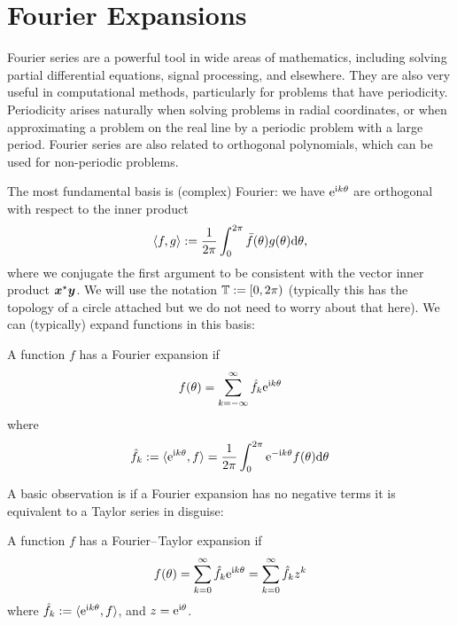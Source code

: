 
\section{Fourier Expansions}
Fourier series are a powerful tool in wide areas of mathematics, including solving partial differential equations, signal processing, and elsewhere. They are also very useful in computational methods, particularly for problems that have periodicity. Periodicity arises naturally when solving problems in radial coordinates, or when approximating a problem on the real line by a periodic problem with a large period. Fourier series are also related to orthogonal polynomials, which can be used for non-periodic problems.

The most fundamental basis is (complex) Fourier: we have ${\rm e}^{{\rm i} k \theta}$ are orthogonal with respect to the inner product
\[
\ensuremath{\langle}f, g \ensuremath{\rangle} := {1 \over 2\ensuremath{\pi}} \ensuremath{\int}_0^{2\ensuremath{\pi}} \bar f(\ensuremath{\theta}) g(\ensuremath{\theta}) {\rm d}\ensuremath{\theta},
\]
where we conjugate the first argument to be consistent with the vector inner product $\bm{{\mbox{\boldmath$x$\unboldmath}}}^\star \bm{{\mbox{\boldmath$y$\unboldmath}}}$. We will use the notation ${\mathbb T} := [0,2\pi)$ (typically this has the topology of a circle attached but we do not need to worry about that here). We can (typically) expand functions in this basis:

\begin{definition}[Fourier] A function $f$ has a Fourier expansion if
\[
f(\theta) = \sum_{k = -\infty}^\infty \hat f_k {\rm e}^{{\rm i} k \theta}
\]
where
\[
\hat f_k := \langle{\rm e}^{{\rm i} k \theta}, f\rangle = {1 \over 2\pi} \int_0^{2\pi}  {\rm e}^{-{\rm i} k \theta} f(\theta) {\rm d}\theta
\]
\end{definition}

A basic observation is if a Fourier expansion has no negative terms it is equivalent to a Taylor series in disguise:

\begin{definition} A function $f$ has a Fourier\ensuremath{\endash}Taylor expansion if
\[
f(\theta) = \sum_{k = 0}^\infty \hat f_k {\rm e}^{{\rm i} k \theta} = \sum_{k = 0}^\infty \hat f_k z^k
\]
where $\hat f_k := \langle{\rm e}^{{\rm i} k \theta}, f\rangle$, and $z = {\rm e}^{{\rm i} \theta}$. \end{definition}

